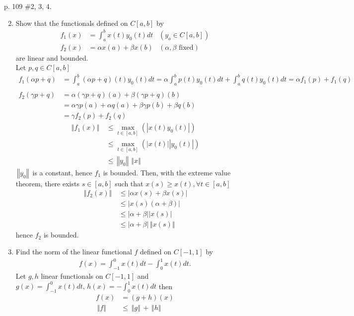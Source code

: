 \documentclass[10pt,a4paper]{report}
\newcommand{\NORM}[1]{\,\left \Vert #1 \right \Vert\,}
\begin{document}
p. 109 \#2, 3, 4.
\begin{enumerate}
	\setcounter{enumi}{1}
	\item Show that the functionals defined on $C[a,b]$ by 
	\begin{align*}
		f_1(x) &= \int_a^b x(t)y_0(t)dt & (y_o\in C[a,b]) \\
		f_2(x) &= \alpha x(a) + \beta x(b) & (\alpha, \beta \text{ fixed})
	\end{align*}are linear and bounded.\\
	Let $p,q \in C[a,b]$
	\begin{align*}
		f_1(\alpha p + q) &= \int_a^b (\alpha p+q)(t)y_0(t)dt = \alpha\int_a^b p(t)y_0(t)dt + \int_a^b q(t)y_0(t)dt = \alpha f_1(p)+f_1(q)\\ \\
		f_2(\gamma p+q) &= \alpha (\gamma p+q)(a) + \beta (\gamma p+q)(b) \\
		&= \alpha \gamma p(a)+\alpha q(a) + \beta \gamma p(b)+\beta q(b) \\
		&= \gamma f_2(p)+f_2(q)
	\end{align*}
	\begin{align*}
		\NORM{f_1(x)} &\le \max_{t\in [a,b]} (|x(t)y_0(t)|) \\
		&\le \max_{t\in [a,b]} (|x(t)| |y_0(t)|) \\
		&\le \NORM{y_0} \NORM{x}
	\end{align*}$\NORM{y_0}$ is a constant, hence $f_1$ is bounded.  Then, with the extreme value theorem, there exists $s \in [a,b]$ such that $x(s) \ge x(t), \forall t \in [a,b]$ 
	\begin{align*}
		\NORM{f_2(x)} &\le | \alpha x(s) + \beta x(s) | \\
		&\le | x(s) (\alpha + \beta)| \\
		&\le |\alpha + \beta| |x(s)| \\
		&\le |\alpha + \beta| \NORM{x(s)}
	\end{align*}hence $f_2$ is bounded.
	\\
	\item Find the norm of the linear functional $f$ defined on $C[-1,1]$ by 
	\begin{align*}
		f(x) = \int_{-1}^0 x(t)dt-\int_0^1 x(t) dt.
	\end{align*}Let $g, h$ linear functionals on $C[-1,1]$ and $g(x) = \int_{-1}^0 x(t)dt,\, h(x) = -\int_0^1 x(t) dt$ then
	\begin{align*}
		f(x) &= (g+h)(x) \\
		\NORM{f} &\le \NORM{g} + \NORM{h} \\

\end{align*}
\end{enumerate}
\end{document}
